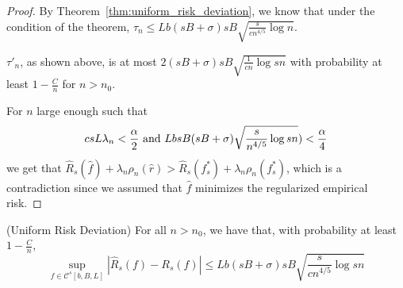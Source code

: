 \begin{proof}
By Theorem~\ref{thm:uniform_risk_deviation}, we know that under the condition of the theorem, $\tau_n \leq  Lb (sB+\sigma) sB \sqrt{ \frac{s}{cn^{4/5}} \log n}$.


$\tau'_n$, as shown above, is at most $2 (sB+\sigma) sB \sqrt{\frac{1}{cn} \log sn}$ with probability at least $1-\frac{C}{n}$ for $n > n_0$.


For $n$ large enough such that
\[
c s L \lambda_n < \frac{\alpha}{2} \textrm{ and } Lb sB (sB+\sigma) \sqrt{ \frac{s}{n^{4/5}} \log sn}) < \frac{\alpha}{4}
\]
we get that $\hat{R}_s(\hat{f}) + \lambda_n \rho_n(\hat{r}) > \hat{R}_s(f^*_s) + \lambda_n \rho_n(f^*_s)$, which is a contradiction since we assumed that $\hat{f}$ minimizes the regularized empirical risk.

\end{proof}

%

\begin{theorem} (Uniform Risk Deviation)
\label{thm:uniform_risk_deviation}
For all $n > n_0$, we have that, with probability at least $1 - \frac{C}{n}$, 
\[
\sup_{f \in \mathcal{C}^s[b,B,L]} |\hat{R}_s(f) - R_s(f)| \leq Lb(sB+\sigma)sB\sqrt{ \frac{s}{cn^{4/5}} \log sn}
\]
\end{theorem}


